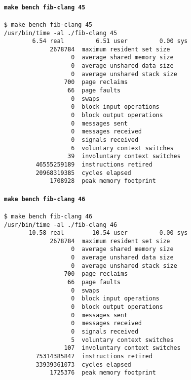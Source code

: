\documentclass{article}
\begin{document}
\paragraph{\lstinline!make bench fib-clang 45!}
\begin{lstlisting}[language=none]
$ make bench fib-clang 45
/usr/bin/time -al ./fib-clang 45
        6.54 real         6.51 user         0.00 sys
             2678784  maximum resident set size
                   0  average shared memory size
                   0  average unshared data size
                   0  average unshared stack size
                 700  page reclaims
                  66  page faults
                   0  swaps
                   0  block input operations
                   0  block output operations
                   0  messages sent
                   0  messages received
                   0  signals received
                   6  voluntary context switches
                  39  involuntary context switches
         46555259189  instructions retired
         20968319385  cycles elapsed
             1708928  peak memory footprint
\end{lstlisting}



\paragraph{\lstinline!make bench fib-clang 46!}
\begin{lstlisting}[language=none]
$ make bench fib-clang 46
/usr/bin/time -al ./fib-clang 46
       10.58 real        10.54 user         0.00 sys
             2678784  maximum resident set size
                   0  average shared memory size
                   0  average unshared data size
                   0  average unshared stack size
                 700  page reclaims
                  66  page faults
                   0  swaps
                   0  block input operations
                   0  block output operations
                   0  messages sent
                   0  messages received
                   0  signals received
                   5  voluntary context switches
                 107  involuntary context switches
         75314385847  instructions retired
         33939361073  cycles elapsed
             1725376  peak memory footprint
\end{lstlisting}
\end{document}
